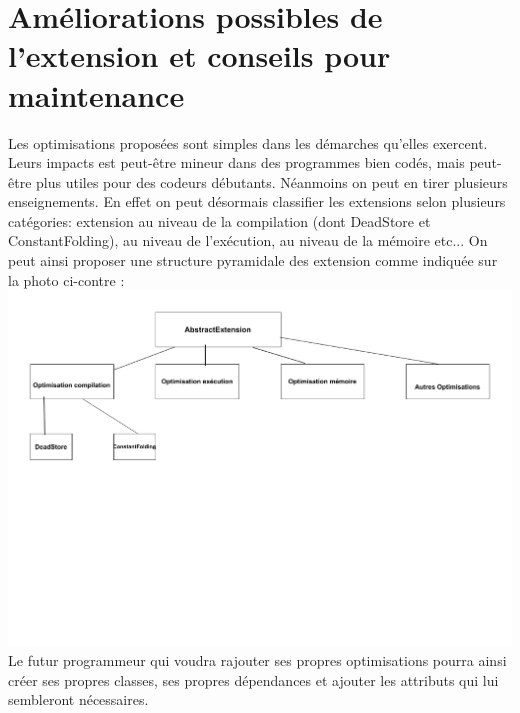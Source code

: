 \documentclass[a4paper]{article}
\begin{document}
\section{Améliorations possibles de l'extension et conseils pour maintenance}
Les optimisations proposées sont simples dans les démarches qu'elles exercent. Leurs impacts est peut-être mineur dans des programmes bien codés, mais peut-être plus utiles pour des codeurs débutants. Néanmoins on peut en tirer plusieurs enseignements.
En effet on peut désormais classifier les extensions selon plusieurs catégories: extension au niveau de la compilation (dont DeadStore et ConstantFolding), au niveau de l'exécution, au niveau de la mémoire etc...
On peut ainsi proposer une structure pyramidale des extension comme indiquée sur la photo ci-contre :\\
\includegraphics[scale=0.5]{UML.pdf}\\
Le futur programmeur qui voudra rajouter ses propres optimisations pourra ainsi créer ses propres classes, ses propres dépendances et ajouter les attributs qui lui sembleront nécessaires.
\end{document}
